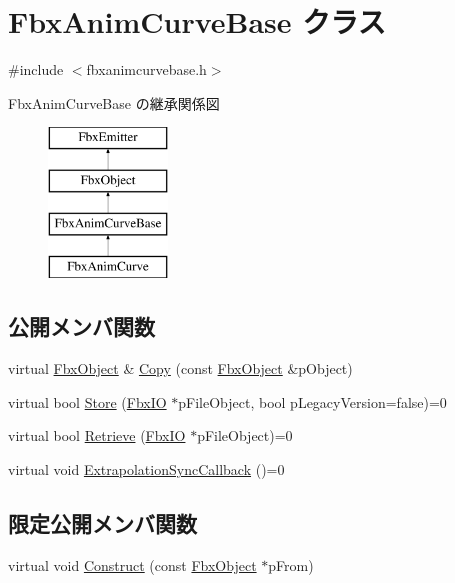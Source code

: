 \hypertarget{class_fbx_anim_curve_base}{}\section{Fbx\+Anim\+Curve\+Base クラス}
\label{class_fbx_anim_curve_base}


{\ttfamily \#include $<$fbxanimcurvebase.\+h$>$}

Fbx\+Anim\+Curve\+Base の継承関係図\begin{figure}[H]
\begin{center}
\leavevmode
\includegraphics[height=4.000000cm]{class_fbx_anim_curve_base}
\end{center}
\end{figure}
\subsection*{公開メンバ関数}
\begin{DoxyCompactItemize}
\item 
virtual \hyperlink{class_fbx_object}{Fbx\+Object} \& \hyperlink{class_fbx_anim_curve_base_abdd0a239c39552fe978b1b571a4d5465}{Copy} (const \hyperlink{class_fbx_object}{Fbx\+Object} \&p\+Object)
\item 
virtual bool \hyperlink{class_fbx_anim_curve_base_a82eba55521f1c0e792b71cb432dac170}{Store} (\hyperlink{class_fbx_i_o}{Fbx\+IO} $\ast$p\+File\+Object, bool p\+Legacy\+Version=false)=0
\item 
virtual bool \hyperlink{class_fbx_anim_curve_base_a58ba1ce28a08145795d95bb27e2db02f}{Retrieve} (\hyperlink{class_fbx_i_o}{Fbx\+IO} $\ast$p\+File\+Object)=0
\item 
virtual void \hyperlink{class_fbx_anim_curve_base_aab573e42ece898c2c1e61a295adbb610}{Extrapolation\+Sync\+Callback} ()=0
\end{DoxyCompactItemize}
\subsection*{限定公開メンバ関数}
\begin{DoxyCompactItemize}
\item 
virtual void \hyperlink{class_fbx_anim_curve_base_af8e0d506c1a09c9fbd7432d4eb5caa02}{Construct} (const \hyperlink{class_fbx_object}{Fbx\+Object} $\ast$p\+From)
\end{DoxyCompactItemize}
